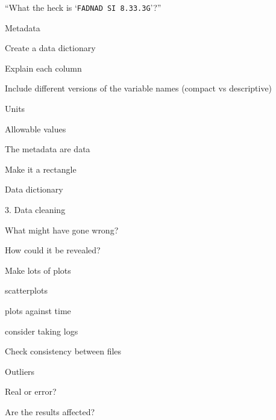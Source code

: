 \documentclass[aspectratio=169,12pt,t]{beamer}
\begin{document}
\begin{frame}[c]{}

\begin{center}
  \Large


``What the heck is `{\hilit \tt FAD{\textunderscore}NAD SI 8.3{\textunderscore}3.3G}'?''

\end{center}

\end{frame}




\begin{frame}[c]{Metadata}

  \bbi
\item Create a data dictionary
  \bi
\item Explain each column
\item Include different versions of the variable names (compact vs descriptive)
\item Units
\item Allowable values
  \ei
\item The metadata are data
  \bi
\item Make it a rectangle
  \ei
\ei

\end{frame}




\begin{frame}[c]{Data dictionary}




\end{frame}





\begin{frame}[c]{3. Data cleaning}

  \bbi
\item What might have gone wrong?
\item How could it be revealed?
\item Make lots of plots
  \bi
\item scatterplots
\item plots against time
\item consider taking logs
  \ei
\item Check consistency between files
\item Outliers
  \bi
\item Real or error?
\item Are the results affected?
  \ei
  \ei

\end{frame}
\end{document}
